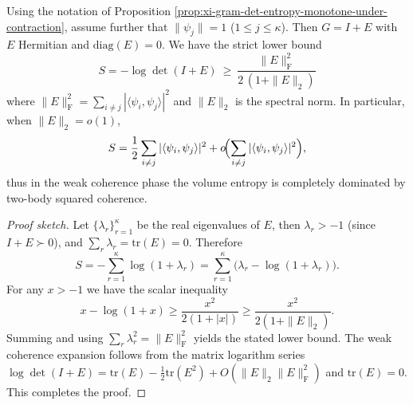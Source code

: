 \begin{proposition}\label{prop:xi-gram-entropy-lower-bound-by-coherence}
Using the notation of Proposition \ref{prop:xi-gram-det-entropy-monotone-under-contraction}, assume further that \(\|\psi_j\|=1\) (\(1\le j\le\kappa\)).
Then \(G=I+E\) with \(E\) Hermitian and \(\mathrm{diag}(E)=0\).
We have the strict lower bound
\[
\boxed{\;
S=-\log\det(I+E)\ \ge\ \frac{\|E\|_{\mathrm F}^{2}}{2\,(1+\|E\|_{2})}\;}
\]
where \(\|E\|_{\mathrm F}^{2}=\sum_{i\neq j}|\langle\psi_i,\psi_j\rangle|^2\) and \(\|E\|_2\) is the spectral norm.
In particular, when \(\|E\|_2=o(1)\),
\[
S=\frac12\sum_{i\neq j}|\langle\psi_i,\psi_j\rangle|^2+o\!\Bigl(\sum_{i\neq j}|\langle\psi_i,\psi_j\rangle|^2\Bigr),
\]
thus in the weak coherence phase the volume entropy is completely dominated by two-body squared coherence.
\end{proposition}
\begin{proof}[Proof sketch]
Let \(\{\lambda_r\}_{r=1}^\kappa\) be the real eigenvalues of \(E\), then \(\lambda_r>-1\) (since \(I+E\succ0\)), and \(\sum_r\lambda_r=\mathrm{tr}(E)=0\).
Therefore
\[
S=-\sum_{r=1}^\kappa\log(1+\lambda_r)=\sum_{r=1}^\kappa\bigl(\lambda_r-\log(1+\lambda_r)\bigr).
\]
For any \(x>-1\) we have the scalar inequality
\[
x-\log(1+x)\ge \frac{x^2}{2(1+|x|)}\ge \frac{x^2}{2(1+\|E\|_2)}.
\]
Summing and using \(\sum_r\lambda_r^2=\|E\|_{\mathrm F}^2\) yields the stated lower bound.
The weak coherence expansion follows from the matrix logarithm series
\(
\log\det(I+E)=\mathrm{tr}(E)-\frac12\mathrm{tr}(E^2)+O(\|E\|_2\|E\|_{\mathrm F}^2)
\)
and \(\mathrm{tr}(E)=0\). This completes the proof.
\end{proof}

